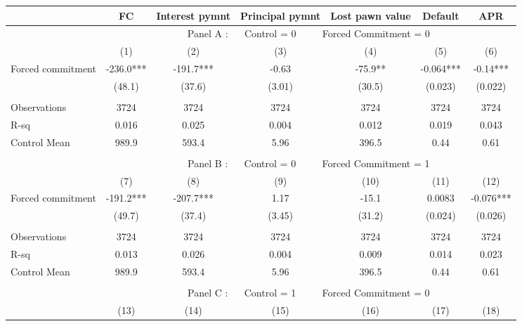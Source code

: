 \begin{tabular}{lcccccc}
\toprule
      & FC    & Interest pymnt & Principal pymnt & Lost pawn value & Default & APR \\
\midrule
      & \multicolumn{6}{c}{Panel A : $\quad$ Control  = 0           $\quad\quad$                  Forced Commitment = 0} \\
\midrule
\midrule
      & (1)   & (2)   & (3)   & (4)   & (5)   & (6) \\
\midrule
\midrule
Forced commitment  & -236.0*** & -191.7*** & -0.63 & -75.9** & -0.064*** & -0.14*** \\
      & (48.1) & (37.6) & (3.01) & (30.5) & (0.023) & (0.022) \\
      &       &       &       &       &       &  \\
\midrule
Observations & 3724  & 3724  & 3724  & 3724  & 3724  & 3724 \\
R-sq  & 0.016 & 0.025 & 0.004 & 0.012 & 0.019 & 0.043 \\
Control Mean & 989.9 & 593.4 & 5.96  & 396.5 & 0.44  & 0.61 \\
\midrule
\midrule
      &       &       &       &       &       &  \\
\midrule
      & \multicolumn{6}{c}{Panel B : $\quad$ Control  = 0         $\quad\quad$                    Forced Commitment = 1} \\
\midrule
\midrule
      & (7)   & (8)   & (9)   & (10)  & (11)  & (12) \\
\midrule
\midrule
Forced commitment  & -191.2*** & -207.7*** & 1.17  & -15.1 & 0.0083 & -0.076*** \\
      & (49.7) & (37.4) & (3.45) & (31.2) & (0.024) & (0.026) \\
      &       &       &       &       &       &  \\
\midrule
Observations & 3724  & 3724  & 3724  & 3724  & 3724  & 3724 \\
R-sq  & 0.013 & 0.026 & 0.004 & 0.009 & 0.014 & 0.023 \\
Control Mean & 989.9 & 593.4 & 5.96  & 396.5 & 0.44  & 0.61 \\
\midrule
\midrule
      &       &       &       &       &       &  \\
\midrule
      & \multicolumn{6}{c}{Panel C : $\quad$ Control  = 1        $\quad\quad$                     Forced Commitment = 0} \\
\midrule
\midrule
      & (13)  & (14)  & (15)  & (16)  & (17)  & (18) \\

\end{tabular}
